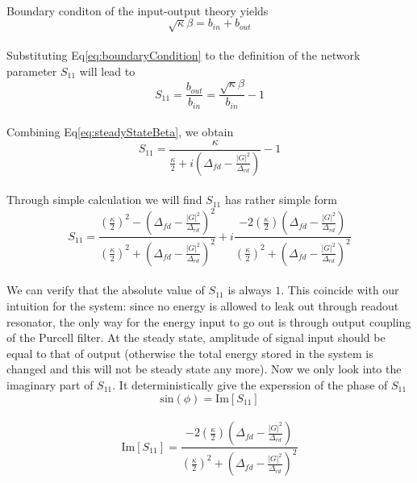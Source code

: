 \\
Boundary conditon of the input-output theory yields
\\
\begin{equation}
	\sqrt{\kappa} \beta = b_{in} + b_{out}
	\label{eq:boundaryCondition}
\end{equation}
\\
Substituting Eq\ref{eq:boundaryCondition} to the definition of the network parameter $S_{11}$ will lead to
\\
\begin{equation}
	S_{11} = \frac{b_{out}}{b_{in}} = \frac{\sqrt{\kappa}\beta}{b_{in}} - 1
\end{equation}
\\
Combining Eq\ref{eq:steadyStateBeta}, we obtain
\\
\begin{equation}
	S_{11} = \frac{\kappa}{\frac{\kappa}{2} + i (\Delta_{fd} - \frac{|G|^2}{\Delta_{rd}})} - 1
\end{equation}
\\
Through simple calculation we will find $S_{11}$ has rather simple form
\\
\begin{equation}
	S_{11} = \frac{(\frac{\kappa}{2})^2 - (\Delta_{fd} - \frac{|G|^2}{\Delta_{rd}})^2}{(\frac{\kappa}{2})^2 + (\Delta_{fd} - \frac{|G|^2}{\Delta_{rd}})^2} + i \frac{-2(\frac{\kappa}{2})(\Delta_{fd} - \frac{|G|^2}{\Delta_{rd}})}{(\frac{\kappa}{2})^2 + (\Delta_{fd} - \frac{|G|^2}{\Delta_{rd}})^2}
\end{equation}
\\
We can verify that the absolute value of $S_{11}$ is always $1$. This coincide with our intuition for the system: since no energy is allowed to leak out through readout resonator, the only way for the energy input to go out is through output coupling of the Purcell filter. At the steady state, amplitude of signal input should be equal to that of output (otherwise the total energy stored in the system is changed and this will not be steady state any more). Now we only look into the imaginary part of $S_{11}$. It deterministically give the experssion of the phase of $S_{11}$
\\
\begin{equation}
	\mathrm{sin}(\phi) = \mathrm{Im}[S_{11}]
\end{equation}
\\
\begin{equation}
	\mathrm{Im}[S_{11}] = \frac{-2(\frac{\kappa}{2})(\Delta_{fd} - \frac{|G|^2}{\Delta_{rd}})}{(\frac{\kappa}{2})^2 + (\Delta_{fd} - \frac{|G|^2}{\Delta_{rd}})^2}
	\label{eq:ImaginaryS11}
\end{equation}
